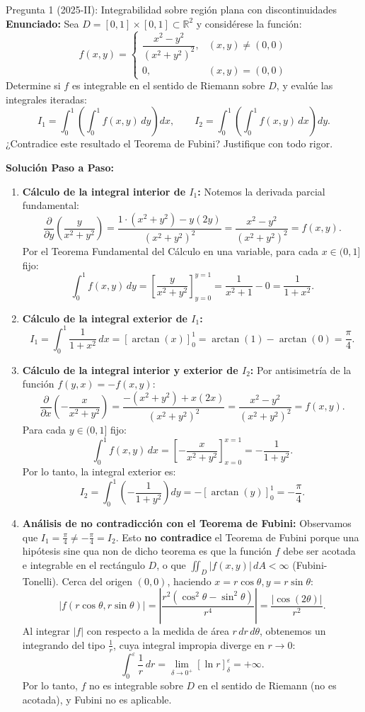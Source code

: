 \documentclass[11pt,a4paper]{article}
\begin{document}
\begin{ejerciciobox}{Pregunta 1 (2025-II): Integrabilidad sobre región plana con discontinuidades}
\textbf{Enunciado:} Sea $D = [0,1] \times [0,1] \subset \mathbb{R}^2$ y considérese la función:
\[
f(x,y) = \begin{cases} 
\dfrac{x^2 - y^2}{(x^2 + y^2)^2}, & (x,y) \neq (0,0) \\
0, & (x,y) = (0,0)
\end{cases}
\]
Determine si $f$ es integrable en el sentido de Riemann sobre $D$, y evalúe las integrales iteradas:
\[
I_1 = \int_0^1 \left( \int_0^1 f(x,y) \, dy \right) dx, \qquad I_2 = \int_0^1 \left( \int_0^1 f(x,y) \, dx \right) dy.
\]
¿Contradice este resultado el Teorema de Fubini? Justifique con todo rigor.

\tcblower
\textbf{Solución Paso a Paso:}
\begin{enumerate}[leftmargin=*]
\item \textbf{Cálculo de la integral interior de $I_1$:}
Notemos la derivada parcial fundamental:
\[
\frac{\partial}{\partial y} \left( \frac{y}{x^2 + y^2} \right) = \frac{1 \cdot (x^2 + y^2) - y(2y)}{(x^2 + y^2)^2} = \frac{x^2 - y^2}{(x^2 + y^2)^2} = f(x,y).
\]
Por el Teorema Fundamental del Cálculo en una variable, para cada $x \in (0, 1]$ fijo:
\[
\int_0^1 f(x,y) \, dy = \left[ \frac{y}{x^2 + y^2} \right]_{y=0}^{y=1} = \frac{1}{x^2 + 1} - 0 = \frac{1}{1 + x^2}.
\]
\item \textbf{Cálculo de la integral exterior de $I_1$:}
\[
I_1 = \int_0^1 \frac{1}{1 + x^2} \, dx = [\arctan(x)]_0^1 = \arctan(1) - \arctan(0) = \frac{\pi}{4}.
\]
\item \textbf{Cálculo de la integral interior y exterior de $I_2$:}
Por antisimetría de la función $f(y,x) = -f(x,y)$:
\[
\frac{\partial}{\partial x} \left( -\frac{x}{x^2 + y^2} \right) = \frac{-(x^2 + y^2) + x(2x)}{(x^2 + y^2)^2} = \frac{x^2 - y^2}{(x^2 + y^2)^2} = f(x,y).
\]
Para cada $y \in (0, 1]$ fijo:
\[
\int_0^1 f(x,y) \, dx = \left[ -\frac{x}{x^2 + y^2} \right]_{x=0}^{x=1} = -\frac{1}{1 + y^2}.
\]
Por lo tanto, la integral exterior es:
\[
I_2 = \int_0^1 \left( -\frac{1}{1 + y^2} \right) dy = -[\arctan(y)]_0^1 = -\frac{\pi}{4}.
\]
\item \textbf{Análisis de no contradicción con el Teorema de Fubini:}
Observamos que $I_1 = \frac{\pi}{4} \neq -\frac{\pi}{4} = I_2$.
Esto \textbf{no contradice} el Teorema de Fubini porque una hipótesis sine qua non de dicho teorema es que la función $f$ debe ser acotada e integrable en el rectángulo $D$, o que $\iint_D |f(x,y)| \, dA < \infty$ (Fubini-Tonelli).
Cerca del origen $(0,0)$, haciendo $x = r\cos\theta, y = r\sin\theta$:
\[
|f(r\cos\theta, r\sin\theta)| = \left| \frac{r^2(\cos^2\theta - \sin^2\theta)}{r^4} \right| = \frac{|\cos(2\theta)|}{r^2}.
\]
Al integrar $|f|$ con respecto a la medida de área $r \, dr \, d\theta$, obtenemos un integrando del tipo $\frac{1}{r}$, cuya integral impropia diverge en $r \to 0$:
\[
\int_0^\varepsilon \frac{1}{r} \, dr = \lim_{\delta \to 0^+} [\ln r]_\delta^\varepsilon = +\infty.
\]
Por lo tanto, $f$ no es integrable sobre $D$ en el sentido de Riemann (no es acotada), y Fubini no es aplicable.
\end{enumerate}
\end{ejerciciobox}
\end{document}
